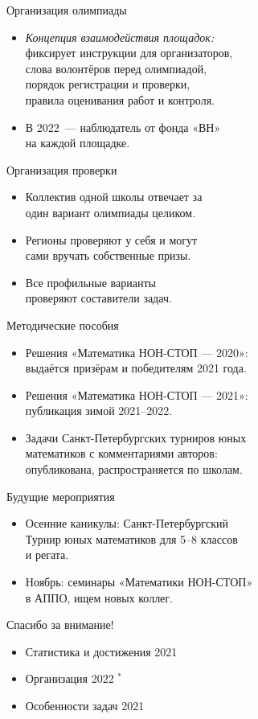 \documentclass[17pt]{extarticle}
\newcommand{\newslide}[1]{\newpage \begin{center} \large #1 \end{center}}
\begin{document}
\newslide{Организация олимпиады}

\begin{itemize}
	\item {\it Концепция взаимодействия площадок:}\\
	фиксирует инструкции для организаторов,\\
	слова волонтёров перед олимпиадой,\\
	порядок регистрации и проверки,\\
	правила оценивания работ и контроля.
	\item В 2022~— наблюдатель от фонда «ВН»\\
	на каждой площадке.
\end{itemize}

\newslide{Организация проверки}

\begin{itemize}
	\item Коллектив одной школы отвечает за\\
	один вариант олимпиады целиком.
	\item Регионы проверяют у себя и могут\\
	сами вручать собственные призы.
	\item Все профильные варианты\\
	проверяют составители задач.
\end{itemize}



\newslide{Методические пособия}

\begin{itemize}
	\item Решения «Математика НОН-СТОП — 2020»:\\ выдаётся призёрам и победителям 2021 года.
	\item Решения «Математика НОН-СТОП — 2021»:\\ публикация зимой 2021–2022.
	\item Задачи Санкт-Петербургских турниров юных\\
	математиков с комментариями авторов:\\
	опубликована, распространяется по школам.
\end{itemize}

\newslide{Будущие мероприятия}

\begin{itemize}
	\item Осенние каникулы: Санкт-Петербургский\\
	Турнир юных математиков для 5–8 классов\\
	и регата.
	\item Ноябрь: семинары «Математики НОН-СТОП»\\
	в АППО, ищем новых коллег.
\end{itemize}

\newpage \begin{center} \Large Спасибо за внимание! \end{center}

\begin{itemize}
	\item Статистика и достижения 2021
	\item Организация 2022 $^*$
	\item Особенности задач 2021
\end{itemize}
\end{document}
